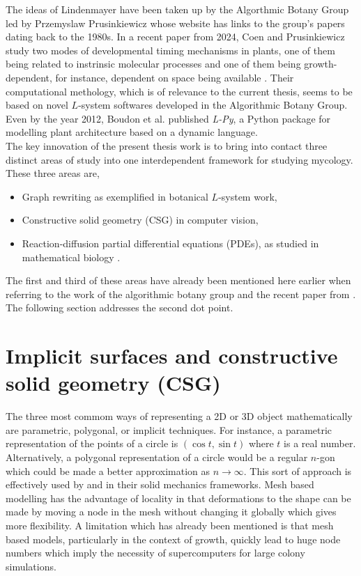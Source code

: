 The ideas  
of Lindenmayer have been taken up by the Algorthmic Botany Group \cite{algorithmicbotany_papers}
led by Przemyslaw Prusinkiewicz whose website has links to the group's papers dating
back to the 1980s. In a recent paper from 2024, Coen and Prusinkiewicz study 
two modes of developmental timing mechanisms in plants, one of them being related 
to instrinsic molecular processes and one of them being growth-dependent, for instance, dependent 
on space being available \cite{coen2024developmental}. Their computational methology,
which is of relevance to the current thesis, seems to be based on novel $L$-system
softwares developed in the Algorithmic Botany Group. Even by the year 2012, 
Boudon et al. \cite{boudon2012py} published \textit{L-Py}, a Python package 
for modelling plant architecture based on a dynamic language.  
\\

The key innovation of the present thesis work is to 
bring into contact three distinct areas of 
study into one interdependent framework for studying mycology. These three 
areas are,
\begin{itemize}
    \item Graph rewriting as exemplified in botanical $L$-system work,
    \item Constructive solid geometry (CSG) in computer vision,
    \item Reaction-diffusion partial differential equations (PDEs),
          as studied in mathematical biology \cite{turing1990chemical}.
\end{itemize}
The first and third of these areas have already been mentioned here earlier when 
referring to the work of the algorithmic botany group and the recent paper from 
\cite{tronnolone2018diffusion}. The following section addresses the second 
dot point.

\section{Implicit surfaces and constructive solid geometry (CSG)}

The three most commom ways 
of representing a 2D or 3D object mathematically are parametric, polygonal,
or implicit techniques. For instance, a parametric representation of the 
points of a circle is $(\cos{t}, \sin{t})$ where $t$
is a real number. Alternatively, a polygonal representation of a circle
would be a regular $n$-gon which could be made a better approximation 
as $n \rightarrow \infty$. This sort of approach is effectively used 
by \cite{van2020quantitative} and \cite{brown2021rigid} in their solid mechanics
frameworks. Mesh based modelling has the advantage of locality in that 
deformations to the shape can be made by moving a node in the mesh
without changing it globally which gives more flexibility.
A limitation which has already been mentioned is that mesh based models, 
particularly in the context of growth, quickly lead to huge node numbers 
which imply the necessity of supercomputers for large colony simulations.
\\

